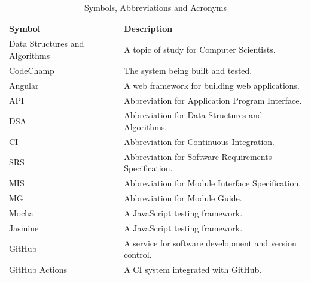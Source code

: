 \documentclass[12pt, titlepage]{article}
\begin{document}
\begin{table}[H]
\begin{center}
\begin{tabular}{|p{3cm}|p{9cm}|}
\hline
  \textbf{Symbol} & \textbf{Description}\\
  \hline
  Data Structures and Algorithms & A topic of study for Computer Scientists.\\
  \hline
  CodeChamp & The system being built and tested.\\
  \hline
  Angular & A web framework for building web applications.\\
  \hline
  API & Abbreviation for Application Program Interface.\\
  \hline
  DSA & Abbreviation for Data Structures and Algorithms.\\
  \hline
  CI & Abbreviation for Continuous Integration.\\
  \hline
  SRS & Abbreviation for Software Requirements Specification.\\
  \hline
  MIS & Abbreviation for Module Interface Specification.\\
  \hline
  MG & Abbreviation for Module Guide.\\
  \hline
  Mocha & A JavaScript testing framework.\\
  \hline
  Jasmine &  A JavaScript testing framework.\\
  \hline
  GitHub & A service for software development and version control.\\
  \hline
  GitHub Actions & A CI system integrated with GitHub.\\
  \hline
\end{tabular}
\end{center}
\caption{Symbols, Abbreviations and Acronyms}            

\end{table}

\newpage

\tableofcontents

\listoftables %

\listoffigures %

\newpage

\end{document}
